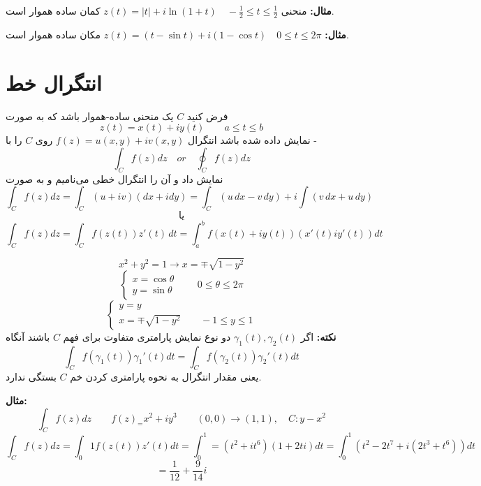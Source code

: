 \documentclass[12pt]{report}
\begin{document}
	 \textbf{مثال:}
	 منحنی
	 $z(t) = |t| + i \ln(1 + t) \quad  -\frac{1}{2} \leq t \leq \frac{1}{2}$
	 کمان ساده هموار است.
	 
	 \textbf{مثال:}
	 $z(t) = (t - \sin t) + i(1 - \cos t)\quad 0 \leq t \leq 2\pi$
	 مکان ساده هموار است.
	 \section{انتگرال خط}
	 فرض کنید 
	 $C$
	 یک منحنی ساده-هموار باشد که به صورت
	 $$z(t) = x(t) + i y(t) \qquad a \leq t \leq b$$
	 نمایش داده شده باشد انتگرال 
	 $f(z) = u(x, y) + i v(x, y)$
	 روی 
	 $C$
	 را با -
	 $$\int_{C} f(z) dz \quad or \quad \oint_{C} f(z) dz$$
	 نمایش داد و آن را انتگرال خطی می‌نامیم و به صورت 
	 $$\int_{C} f(z) dz = \int_{C} (u + iv)(dx + idy) = \int_{C}(u \, dx -v \, dy) + i\int (v \, dx + u \, dy)
	 $$
	 $$\text{یا}$$
	 $$\int_{C} f(z) dz = \int_{C} f(z(t)) z'(t) \, dt = \int_{a}^{b} f(x(t) + i y(t))(x'(t) i y'(t)) dt$$
	 
	 $$x^2 + y^2 = 1 \rightarrow x =\mp \sqrt{1 - y^2}$$
	 \[
	 \begin{cases}
	 	x = \cos \theta \\
	 	y = \sin \theta
	 \end{cases}
 \qquad 0 \leq \theta \leq 2\pi
	 \]
	 \[
	 \begin{cases}
	 	y = y \\
	 	x = \mp \sqrt{1 - y^2} \qquad -1 \leq y \leq 1
	 \end{cases}
	 \]
	 \textbf{نکته:}
	 اگر 
	 $\gamma_1(t) , \gamma_2(t)$
	 دو نوع نمایش پارامتری متفاوت برای فهم 
	 $C$
	 باشند آنگاه
	 $$\int_{C} f(\gamma_1(t)) \gamma_1'(t) dt = \int_{C} f(\gamma_2(t)) \gamma_2'(t) dt$$ 
	 یعنی مقدار انتگرال به نحوه پارامتری کردن خم 
	 $C$
	 بستگی ندارد.
	 
	 \textbf{مثال:}
	 $$\int_{C} f(z) dz \qquad f(z)_ = x^2 + iy^3 \qquad (0,0) \rightarrow (1, 1), \quad C: y - x^2$$
	 $$\int_{C} f(z) dz = \int_{0}{1} f(z(t)) z'(t) dt = \int_{0}^{1} = (t^2 + it^6)(1 + 2ti)dt = \int_{0}^{1} (t^2 - 2t^7 + i(2t^3 + t^6))dt$$
	 $$=\frac{1}{12} + \frac{9}{14}i$$
\end{document}

